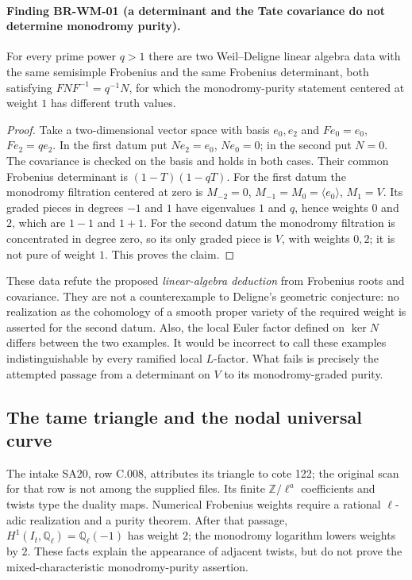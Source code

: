 \documentclass[11pt,a4paper]{article}
\theoremstyle{definition}\newtheorem{definition}[theorem]{Definition}
\theoremstyle{remark}\newtheorem{remark}[theorem]{Remark}
\begin{document}
\paragraph{Finding BR-WM-01 (a determinant and the Tate covariance do not
determine monodromy purity).}
For every prime power $q>1$ there are two Weil--Deligne linear
algebra data with the same semisimple Frobenius and the same
Frobenius determinant, both satisfying $FNF^{-1}=q^{-1}N$, for
which the monodromy-purity statement centered at weight $1$ has
different truth values.

\begin{proof}
Take a two-dimensional vector space with basis $e_0,e_2$ and
$Fe_0=e_0$, $Fe_2=qe_2$.  In the first datum put
$Ne_2=e_0$, $Ne_0=0$; in the second put $N=0$.
The covariance is checked on the basis and holds in both cases.
Their common Frobenius determinant is $(1-T)(1-qT)$.
For the first datum the monodromy filtration centered at zero is
$M_{-2}=0$, $M_{-1}=M_0=\langle e_0\rangle$, $M_1=V$.
Its graded pieces in degrees $-1$ and $1$ have eigenvalues $1$
and $q$, hence weights $0$ and $2$, which are $1-1$ and $1+1$.
For the second datum the monodromy filtration is concentrated in
degree zero, so its only graded piece is $V$, with weights $0,2$;
it is not pure of weight $1$.  This proves the claim.
\end{proof}

These data refute the proposed \emph{linear-algebra deduction} from
Frobenius roots and covariance.  They are not a counterexample to
Deligne's geometric conjecture: no realization as the cohomology
of a smooth proper variety of the required weight is asserted for
the second datum.  Also, the local Euler factor defined on
$\ker N$ differs between the two examples.  It would be incorrect
to call these examples indistinguishable by every ramified local
$L$-factor.  What fails is precisely the attempted passage from
a determinant on $V$ to its monodromy-graded purity.

\subsection{The tame triangle and the nodal universal curve}

The intake SA20, row C.008, attributes its triangle to cote 122;
the original scan for that row is not among the supplied files.
Its finite $\mathbb Z/\ell^a$ coefficients and twists type the
duality maps.  Numerical Frobenius weights require a rational
$\ell$-adic realization and a purity theorem.  After that passage,
$H^1(I_t,\mathbb Q_\ell)=\mathbb Q_\ell(-1)$ has weight $2$;
the monodromy logarithm lowers weights by $2$.  These facts explain
the appearance of adjacent twists, but do not prove the
mixed-characteristic monodromy-purity assertion.
\end{document}
